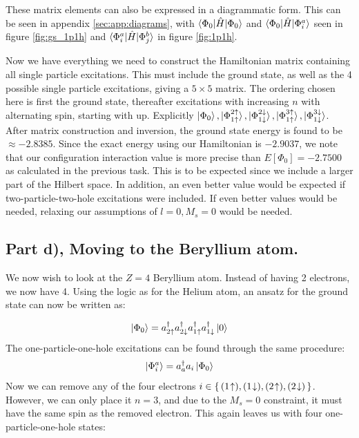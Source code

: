 \documentclass{article}
\newcommand{\vac}{\ket{0}}
\newcommand{\gs}{\ket{\Phi_0}}
\newcommand{\exed}[2]{\ket{\Phi_{#1}^{#2}}}
\newcommand{\ups}[1]{#1\uparrow}
\newcommand{\downs}[1]{#1\downarrow}
\newcommand{\upst}[1]{#1\hspace{-2px}\uparrow}
\newcommand{\downst}[1]{#1\hspace{-2px}\downarrow}
\newcommand{\inner}[3]{\braket{#1|#2|#3}}
\newcommand{\crt}[1]{a_{#1}^{\dagger}}
\newcommand{\ani}[1]{a_{#1}}
\begin{document}
    These matrix elements can also be expressed in a diagrammatic form. This can be seen in appendix \ref{sec:app:diagrams}, with $\inner{\Phi_0}{\hat{H}}{\Phi_0}$ and $\inner{\Phi_0}{\hat{H}}{\Phi_i^a}$ seen in figure \ref{fig:gs_1p1h} and $\inner{\Phi_i^a}{\hat{H}}{\Phi_j^b}$ in figure \ref{fig:1p1h}.

    Now we have everything we need to construct the Hamiltonian matrix containing all single particle excitations. This must include the ground state, as well as the 4 possible single particle excitations, giving a $5 \times 5$ matrix. The ordering chosen here is first the ground state, thereafter excitations with increasing $n$ with alternating spin, starting with up. Explicitly $\gs,\exed{\ups{1}}{\ups{2}}, \exed{\downs{1}}{\downs{2}}, \exed{\ups{1}}{\ups{3}}, \exed{\downs{1}}{\downs{3}}$. After matrix construction and inversion, the ground state energy is found to be $\approx -2.8385$. Since the exact energy using our Hamiltonian is $-2.9037$, we note that our configuration interaction value is more precise than $E[\Phi_0] = -2.7500$ as calculated in the previous task. This is to be expected since we include a larger part of the Hilbert space. In addition, an even better value would be expected if two-particle-two-hole excitations were included. If even better values would be needed, relaxing our assumptions of $l=0, M_s = 0$ would be needed.     

\subsection*{Part d), Moving to the Beryllium atom.}
    We now wish to look at the $Z = 4$ Beryllium atom. Instead of having 2 electrons, we now have 4. Using the logic as for the Helium atom, an ansatz for the ground state can now be written as:

    \begin{align*}
        \gs = \crt{\ups{2}}\crt{\downs{2}}\crt{\ups{1}}\crt{\downs{1}} \vac       
    \end{align*}
    The one-particle-one-hole excitations can be found through the same procedure:
    \begin{align*}
        \exed{i}{a} = \crt{a}\ani{i}\gs
    \end{align*}
    Now we can remove any of the four electrons $i \in \set{(\upst{1}), (\downst{1}), (\upst{2}), (\downst{2})}$. However, we can only place it $n = 3$, and due to the $M_s = 0$ constraint, it must have the same spin as the removed electron. This again leaves us with four one-particle-one-hole states:
    
\end{document}
